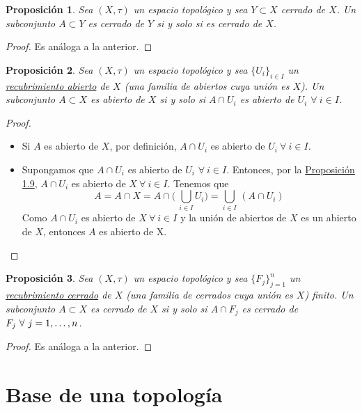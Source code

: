 \documentclass[12pt]{report}
\newtheorem{proposition}{Proposición}[chapter]
\theoremstyle{definition}
\theoremstyle{definition}
\theoremstyle{remark}
\begin{document}
\begin{proposition}
Sea $(X,\tau)$ un espacio topológico y sea $Y \subset X$ cerrado de $X$. Un subconjunto $A \subset Y$ es cerrado de $Y$ si y solo si es cerrado de $X$.
\end{proposition}

\begin{proof}
Es análoga a la anterior.
\end{proof}

\begin{proposition}
Sea $(X,\tau)$ un espacio topológico y sea $\{U_i\}_{i \in I}$ un \underline{recubrimiento abierto} de $X$ (una familia de abiertos cuya unión es $X$). Un subconjunto $A \subset X$ es abierto de $X$ si y solo si $A \cap U_i$ es abierto de $U_i$ $\forall \ i \in I$.
\end{proposition}

\begin{proof}
\hfill
\begin{itemize}
    \item[{\fbox[rb]{$\Rightarrow$}}] Si $A$ es abierto de $X$, por definición, $A \cap U_i$ es abierto de $U_i \ \forall \ i \in I$. 
    \item[{\fbox[rb]{$\Leftarrow$}}] Supongamos que $A \cap U_i$ es abierto de $U_i$ $\forall \ i \in I$. Entonces, por la \hyperref[prop1.9.]{\color{blue}Proposición 1.9}, $A \cap U_i$ es abierto de $X \ \forall \ i \in I$. Tenemos que \[A = A \cap X = A \cap \biggl( \ \bigcup_{i \in I}U_i \biggr) = \bigcup_{i \in I} \, (A \cap U_i)\] Como $A \cap U_i$ es abierto de $X \ \forall \ i \in I$ y la unión de abiertos de $X$ es un abierto de $X$, entonces $A$ es abierto de X.
\end{itemize}
\end{proof}

\begin{proposition}
Sea $(X,\tau)$ un espacio topológico y sea $\{F_j\}_{j=1}^n$ un \underline{recubrimiento cerrado} de $X$ (una familia de cerrados cuya unión es $X$) finito. Un subconjunto $A \subset X$ es cerrado de $X$ si y solo si $A \cap F_j$ es cerrado de $F_j \ \forall \ j = 1,\mathellipsis,n$.
\end{proposition}

\begin{proof}
Es análoga a la anterior.
\end{proof}

\section{Base de una topología}
\end{document}
